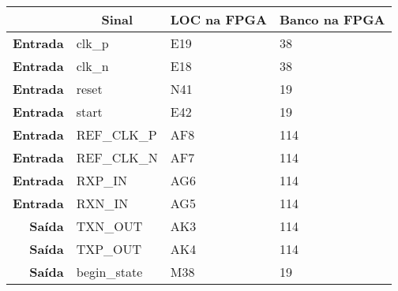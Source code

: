 \begin{table}[h!]
	\centering
		\begin{tabular}{rlll}
			\hline
			\multicolumn{1}{l}{}                  & \multicolumn{1}{c}{\textbf{Sinal}} & \multicolumn{1}{c}{\textbf{LOC na FPGA}} & \multicolumn{1}{c}{\textbf{Banco na FPGA}} \\ \hline
			\multicolumn{1}{r|}{\textbf{Entrada}} & clk\_p                             & E19                                      & 38                                         \\
			\multicolumn{1}{r|}{\textbf{Entrada}} & clk\_n                             & E18                                      & 38                                         \\
			\multicolumn{1}{r|}{\textbf{Entrada}} & reset                              & N41                                      & 19                                         \\
			\multicolumn{1}{r|}{\textbf{Entrada}} & start                              & E42                                      & 19                                         \\
			\multicolumn{1}{r|}{\textbf{Entrada}} & REF\_CLK\_P                        & AF8                                      & 114                                        \\
			\multicolumn{1}{r|}{\textbf{Entrada}} & REF\_CLK\_N                        & AF7                                      & 114                                        \\
			\multicolumn{1}{r|}{\textbf{Entrada}} & RXP\_IN                            & AG6                                      & 114                                        \\
			\multicolumn{1}{r|}{\textbf{Entrada}} & RXN\_IN                            & AG5                                      & 114                                        \\
			\multicolumn{1}{r|}{\textbf{Saída}}   & TXN\_OUT                           & AK3                                      & 114                                        \\
			\multicolumn{1}{r|}{\textbf{Saída}}   & TXP\_OUT                           & AK4                                      & 114                                        \\
			\multicolumn{1}{r|}{\textbf{Saída}}   & begin\_state                       & M38                                      & 19                                         \\

\end{tabular}
\end{table}
